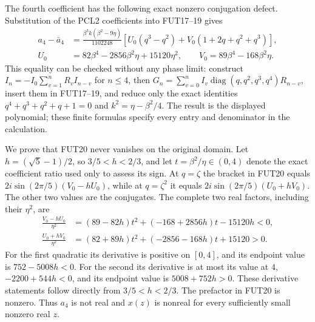 The fourth coefficient has the following exact nonzero conjugation
defect. Substitution of the PCL2 coefficients into FUT17--19 gives
\[
 \begin{split}
 a_4-\bar a_4
 &=\frac{\beta^3k(\beta^2-9\eta)}{1102248}
   \left[U_0(q^3-q^2)+V_0(1+2q+q^2+q^3)\right],\\
 U_0&=82\beta^4-2856\beta^2\eta+15120\eta^2,\qquad
 V_0=89\beta^4-168\beta^2\eta.
 \end{split}\tag{FUT20}
\]
This equality can be checked without any phase limit: construct
$I_n=-I_0\sum_{v=1}^nR_vI_{n-v}$ for $n\le4$, then
$G_n=\sum_{v=0}^nI_v\operatorname{diag}(q,q^2,q^3,q^4)R_{n-v}$,
insert them in FUT17--19, and reduce only the exact identities
$q^4+q^3+q^2+q+1=0$ and $k^2=\eta-\beta^2/4$.
The result is the displayed polynomial; these finite formulas specify
every entry and denominator in the calculation.

We prove that FUT20 never vanishes on the original domain.
Let $h=(\sqrt5-1)/2$, so $3/5<h<2/3$, and let
$t=\beta^2/\eta\in(0,4)$ denote the exact coefficient ratio used
only to assess its sign. At $q=\zeta$ the bracket in FUT20 equals
$2i\sin(2\pi/5)(V_0-hU_0)$, while at $q=\zeta^2$ it equals
$2i\sin(2\pi/5)(U_0+hV_0)$. The other two values are the conjugates.
The complete two real factors, including their $\eta^2$, are
\[
 \begin{split}
 \frac{V_0-hU_0}{\eta^2}
 &=(89-82h)t^2+(-168+2856h)t-15120h<0,\\
 \frac{U_0+hV_0}{\eta^2}
 &=(82+89h)t^2+(-2856-168h)t+15120>0.
 \end{split}\tag{FUT21}
\]
For the first quadratic its derivative is positive on $[0,4]$,
and its endpoint value is $752-5008h<0$.
For the second its derivative is at most its value at $4$,
$-2200+544h<0$, and its endpoint value is $5008+752h>0$.
These derivative statements follow directly from $3/5<h<2/3$.
The prefactor in FUT20 is nonzero. Thus $a_4$ is not real and
$x(z)$ is nonreal for every sufficiently small nonzero real $z$.

